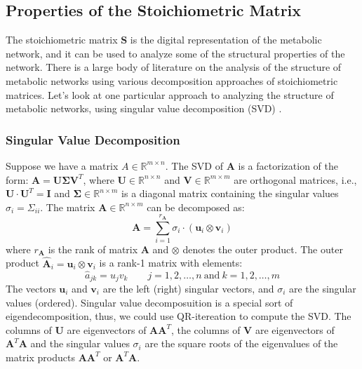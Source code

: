 \documentclass{article}[12pt]
\def\R{\mathbb{R}}
\begin{document}
\subsection{Properties of the Stoichiometric Matrix}
The stoichiometric matrix $\mathbf{S}$ is the digital representation of the metabolic network, and it can be used to analyze some of the structural properties of the network.
There is a large body of literature on the analysis of the structure of metabolic networks using various decomposition approaches of stoichiometric matrices. 
Let's look at one particular approach to analyzing the structure of metabolic networks, using singular value decomposition (SVD) \cite{Famili:2003aa}.

\subsubsection*{Singular Value Decomposition}
Suppose we have a matrix $A \in \R^{m \times n}$. The SVD of $\mathbf{A}$ is a factorization of the form: $\mathbf{A} = \mathbf{U}\mathbf{\Sigma}\mathbf{V}^{T}$, where
$\mathbf{U}\in\mathbb{R}^{n\times{n}}$ and $\mathbf{V}\in\mathbb{R}^{m\times{m}}$ are orthogonal matrices, i.e., $\mathbf{U}\cdot\mathbf{U}^{T} = \mathbf{I}$ and $\mathbf{\Sigma}\in\mathbb{R}^{n\times{m}}$ is a diagonal matrix containing 
the singular values $\sigma_{i}=\Sigma_{ii}$. The matrix $\mathbf{A}\in\mathbb{R}^{n\times{m}}$ can be decomposed as:
\begin{equation*}
\mathbf{A} = \sum_{i=1}^{r_{\mathbf{A}}}\sigma_{i}\cdot\left(\mathbf{u}_{i}\otimes\mathbf{v}_{i}\right)
\end{equation*}
where $r_{\mathbf{A}}$ is the rank of matrix $\mathbf{A}$ and $\otimes$ denotes the outer product. 
The outer product $\hat{\mathbf{A}}_{i} = \mathbf{u}_{i}\otimes\mathbf{v}_{i}$ is a rank-1 matrix with elements: 
\begin{equation*}
\hat{a}_{jk} = u_{j}v_{k}\qquad{j=1,2,\dots,n~\text{and}~k=1,2,\dots,m}
\end{equation*}
The vectors $\mathbf{u}_{i}$ and $\mathbf{v}_{i}$ are the left (right) singular vectors, 
and $\sigma_{i}$ are the singular values (ordered). Singular value decomposuition is a special sort of eigendecomposition, thus, we could use QR-itereation to compute the SVD.
The columns of $\mathbf{U}$ are eigenvectors of $\mathbf{A}\mathbf{A}^{T}$, 
the columns of $\mathbf{V}$ are eigenvectors of $\mathbf{A}^{T}\mathbf{A}$ and
the singular values $\sigma_{i}$ are the square roots of the eigenvalues of the matrix products $\mathbf{A}\mathbf{A}^{T}$ or $\mathbf{A}^{T}\mathbf{A}$. 
\end{document}
